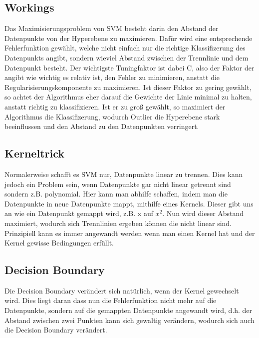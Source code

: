 \documentclass{article}
\begin{document}
\subsection{Workings}
Das Maximisierungsproblem von SVM besteht darin den Abstand der Datenpunkte von der Hyperebene zu maximieren. Dafür wird eine entsprechende Fehlerfunktion gewählt, welche nicht einfach nur die richtige Klassifizerung des Datenpunkts angibt, sondern wieviel Abstand zwischen der Trennlinie und dem Datenpunkt besteht. Der wichtigste Tuningfaktor ist dabei C, also der Faktor der angibt wie wichtig es relativ ist, den Fehler zu minimieren, anstatt die Regularisierungskomponente zu maximieren. Ist dieser Faktor zu gering gewählt, so achtet der Algorithmus eher darauf die Gewichte der Linie minimal zu halten, anstatt richtig zu klassifizieren. Ist er zu groß gewählt, so maximiert der Algorithmus die Klassifizerung, wodurch Outlier die Hyperebene stark beeinflussen und den Abstand zu den Datenpunkten verringert.

\subsection{Kerneltrick}
Normalerweise schafft es SVM nur, Datenpunkte linear zu trennen. Dies kann jedoch ein Problem sein, wenn Datenpunkte gar nicht linear getrennt sind sondern z.B. polynomial. Hier kann man abhilfe schaffen, indem man die Datenpunkte in neue Datenpunkte mappt, mithilfe eines Kernels. Dieser gibt uns an wie ein Datenpunkt gemappt wird, z.B. x auf $x^2$. Nun wird dieser Abstand maximiert, wodurch sich Trennlinien ergeben können die nicht linear sind. Prinzipiell kann es immer angewandt werden wenn man einen Kernel hat und der Kernel gewisse Bedingungen erfüllt.

\subsection{Decision Boundary}
Die Decision Boundary verändert sich natürlich, wenn der Kernel gewechselt wird. Dies liegt daran dass nun die Fehlerfunktion nicht mehr auf die Datenpunkte, sondern auf die gemappten Datenpunkte angewandt wird, d.h. der Abstand zwischen zwei Punkten kann sich gewaltig verändern, wodurch sich auch die Decision Boundary verändert.
\end{document}
